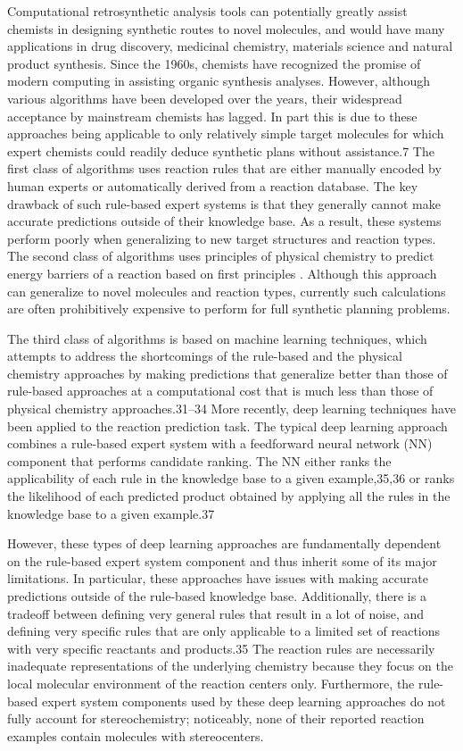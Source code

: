 Computational retrosynthetic analysis tools can potentially greatly assist chemists in designing synthetic routes to novel molecules, and would have many applications in drug discovery, medicinal chemistry, materials science and natural product synthesis. Since the 1960s, chemists have recognized the promise of modern computing in assisting organic synthesis analyses. However, although various algorithms have been developed over the years, their widespread acceptance by mainstream chemists has lagged\cite{ley2015organic}. In part this is due to these approaches being applicable to only relatively simple target molecules for which expert chemists could readily deduce synthetic plans without assistance.7 The first class of algorithms uses reaction rules that are either manually encoded by human experts or automatically derived from a reaction database. \cite{szymkuc2016computer, segler2017modelling} The key drawback of such rule-based expert systems is that they generally cannot make accurate predictions outside of their knowledge base. As a result, these systems perform poorly when generalizing to new target structures and reaction types. The second class of algorithms uses principles of physical chemistry to predict energy barriers of a reaction based on first principles \cite{zimmerman2013automated, martinez2017ab}. Although this approach can generalize to novel molecules and reaction types, currently such calculations are often prohibitively expensive to perform for full synthetic planning problems.

The third class of algorithms is based on machine learning techniques, which attempts to address the shortcomings of the rule-based and the physical chemistry approaches by making predictions that generalize better than those of rule-based approaches at a computational cost that is much less than those of physical chemistry approaches.31–34 More recently, deep learning techniques have been applied to the reaction prediction task. The typical deep learning approach combines a rule-based expert system with a feedforward neural network (NN) component that performs candidate ranking. The NN either ranks the applicability of each rule in the knowledge base to a given example,35,36 or ranks the likelihood of each predicted product obtained by applying all the rules in the knowledge base to a given example.37 

However, these types of deep learning approaches are fundamentally dependent on the rule-based expert system component and thus inherit some of its major limitations. In particular, these approaches have issues with making accurate predictions outside of the rule-based knowledge base. Additionally, there is a tradeoff between defining very general rules that result in a lot of noise, and defining very specific rules that are only applicable to a limited set of reactions with very specific reactants and products.35 The reaction rules are necessarily inadequate representations of the underlying chemistry because they focus on the local molecular environment of the reaction centers only. Furthermore, the rule-based expert system components used by these deep learning approaches do not fully account for stereochemistry; noticeably, none of their reported reaction examples contain molecules with stereocenters.

